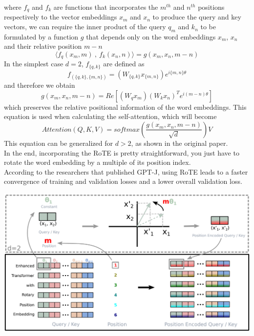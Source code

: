 where $f_q$ and $f_k$ are functions that incorporates the $m^{th}$ and $n^{th}$ positions respectively to the vector embeddings $x_m$ and $x_n$ to produce the query and key vectors, we can require the inner product of the query $q_m$ and $k_n$ to be formulated by a function $g$ that depends only on the word embeddings $x_m$, $x_n$ and their relative position $m - n$
\begin{equation*}
    \langle f_q(x_m, m) \: , \: f_k(x_n, n) \rangle = g(x_m,x_n,m-n)
\end{equation*}
In the simplest case $d=2$, $f_{\{q,k\}}$ are defined as
\begin{equation*}
    f_{(\{q,k\}, \{m,n\})} = (W_{\{q,k\}}x_{\{m,n\}})e^{i\{m,n\}\theta}
\end{equation*}
and therefore we obtain
\begin{equation*}
    g(x_m, x_n, m - n) = Re[(W_qx_m)(W_kx_n)^Te^{i(m-n)\theta}]
\end{equation*}
which preserves the relative positional information of the word embeddings. This equation is used when calculating the self-attention, which will become
\begin{equation*}
    Attention(Q,K,V) = softmax\left(\frac{g(x_m, x_n, m - n)}{\sqrt{d}}\right)V
\end{equation*}
This equation can be generalized for $d > 2$, as shown in the original paper. \\
In the end, incorporating the RoTE is pretty straightforward, you just have to rotate the word embedding by a multiple of its position index. \\
According to the researchers that published GPT-J\cite{rope-eleutherai}, using RoTE leads to a faster convergence of training and validation losses and a lower overall validation loss.

\noindent
\begin{minipage}{\linewidth}
    \includegraphics[width=\linewidth]{images/rotary_embedding_from_paper.PNG}
\end{minipage}%